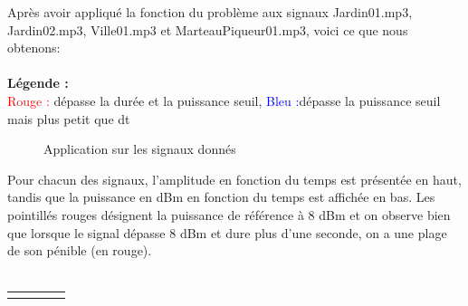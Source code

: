 Après avoir appliqué la fonction du problème aux signaux Jardin01.mp3, Jardin02.mp3, Ville01.mp3 et MarteauPiqueur01.mp3, voici ce que nous obtenons:
\\
\\
\textbf{Légende :}
\\
\textcolor{red}{Rouge :} dépasse la durée et la puissance seuil, \textcolor{blue}{Bleu :}dépasse la puissance seuil mais plus petit que dt

\begin{figure}[htb]
\caption{Application sur les signaux donnés}
\label{Fig.main.2}
\end{figure}

Pour chacun des signaux, l'amplitude en fonction du temps est présentée en haut, tandis que la puissance en dBm en fonction du temps est affichée en bas. Les pointillés rouges désignent la puissance de référence à 8 dBm et on observe bien que lorsque le signal dépasse 8 dBm et dure plus d'une seconde, on a une plage de son pénible (en rouge).
\\
\\
\begin{tabular}{|c|c|c|c|}
\hline
&
\end{tabular}
